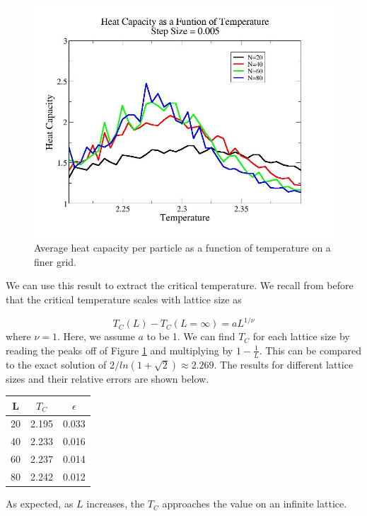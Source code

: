 \documentclass[%
oneside,                 %
final,                   %
10pt]{article}
\begin{document}
\begin{figure}[H]\label{fig:fineheat}
  \centering
    \includegraphics[width=1.1 \textwidth]{fineheat.jpg}
    \caption{Average heat capacity per particle as a function of temperature on a finer grid.}
\end{figure} 

We can use this result to extract the critical temperature.  We recall from before that the critical temperature scales with lattice size as 

\[
T_C(L)-T_C(L=\infty)=a L^{1/\nu}
\]
 where $\nu=1$.  Here, we assume $a$ to be 1.  We can find $T_C$ for each lattice size by reading the peaks off of Figure \ref{fig:fineheat} and multiplying by $1-\frac{1}{L}$.  This can be compared to the exact solution of $2/ln(1+\sqrt{2}) \approx 2.269$.  The results for different lattice sizes and their relative errors are shown below.

\begin{center} 
\begin{tabular}{ |c|c|c| }
\hline
L & $T_C$ & $\epsilon$ \\
\hline
20 & 2.195 & 0.033 \\
40 & 2.233 & 0.016 \\
60 & 2.237 &  0.014\\
80 & 2.242 & 0.012 \\
\hline
\end{tabular}
\label{table:test}
\end{center}

As expected, as $L$ increases, the $T_C$ approaches the value on an infinite lattice.
\end{document}
